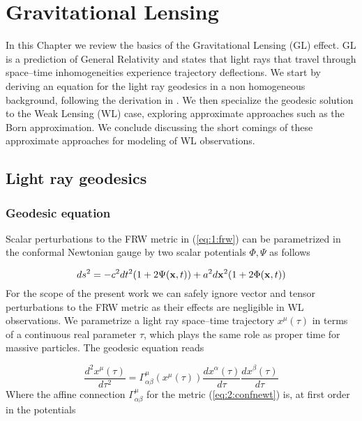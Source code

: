
\chapter{Gravitational Lensing}
\lhead[\fancyplain{}{\thepage}]{\fancyplain{}{\rightmark}}
 \thispagestyle{plain}
\setlength{\parindent}{10mm}


In this Chapter we review the basics of the Gravitational Lensing (GL) effect. GL is a prediction of General Relativity and states that light rays that travel through space--time inhomogeneities experience trajectory deflections. We start by deriving an equation for the light ray geodesics in a non homogeneous background, following the derivation in \citep{Dodelson-C11}. We then specialize the geodesic solution to the Weak Lensing (WL) case, exploring approximate approaches such as the Born approximation. We conclude discussing the short comings of these approximate approaches for modeling of WL observations. 

\section{Light ray geodesics}

\subsection{Geodesic equation}
Scalar perturbations to the FRW metric in (\ref{eq:1:frw}) can be parametrized in the conformal Newtonian gauge by two scalar potentials $\Phi,\Psi$ as follows

\begin{equation}
\label{eq:2:confnewt}
ds^2 = -c^2dt^2(1+2\Psi(\mathbf{x},t)) + a^2d\mathbf{x}^2(1+2\Phi(\mathbf{x},t))
\end{equation}
%
For the scope of the present work we can safely ignore vector and tensor perturbations to the FRW metric as their effects are negligible in WL observations. We parametrize a light ray space--time trajectory $x^\mu(\tau)$ in terms of a continuous real parameter $\tau$, which plays the same role as proper time for massive particles. The geodesic equation reads 

\begin{equation}
\label{eq:2:geodesic}
\frac{d^2 x^\mu(\tau)}{d\tau^2} = \Gamma_{\alpha\beta}^\mu(x^\mu(\tau)) \frac{d x^\alpha(\tau)}{d\tau}\frac{d x^\beta(\tau)}{d\tau}
\end{equation}
%
Where the affine connection $\Gamma_{\alpha\beta}^\mu$ for the metric (\ref{eq:2:confnewt}) is, at first order in the potentials

